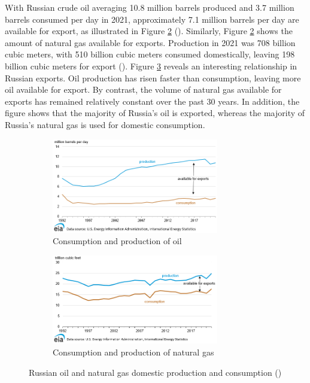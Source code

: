 \documentclass[12pt]{article}
\begin{document}
With Russian crude oil averaging 10.8 million barrels produced and 3.7 million barrels consumed per day in 2021, approximately 7.1 million barrels per day are available for export, as illustrated in Figure \ref{fig:gas export avail} (\citeauthor{eia_2023}). Similarly, Figure \ref{fig:gas export avail} shows the amount of natural gas available for exports. Production in 2021 was 708 billion cubic meters, with 510 billion cubic meters consumed domestically, leaving 198 billion cubic meters for export (\citeauthor{eia_2023}). Figure \ref{fig:energy export avail} reveals an interesting relationship in Russian exports. Oil production has risen faster than consumption, leaving more oil available for export. By contrast, the volume of natural gas available for exports has remained relatively constant over the past 30 years. In addition, the figure shows that the majority of Russia's oil is exported, whereas the majority of Russia's natural gas is used for domestic consumption. 

\begin{figure}[h]
     \centering
     \begin{subfigure}[b]{0.45\textwidth}
         \centering
         \includegraphics[width=0.8\textwidth]{images/oil export avail.png}
         \caption{Consumption and production of oil}
         \label{fig:oil export avail}
     \end{subfigure}
     \hfill
     \begin{subfigure}[b]{0.45\textwidth}
         \centering
         \includegraphics[width=0.8\textwidth]{images/gas export avail.png}
         \caption{Consumption and production of natural gas}
         \label{fig:gas export avail}
     \end{subfigure}
     \hfill
        \caption{Russian oil and natural gas domestic production and consumption (\citeauthor{eia_2023})}
        \label{fig:energy export avail}
\end{figure}
\end{document}

